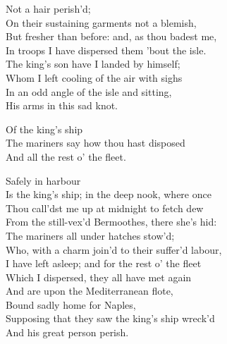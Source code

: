 	
	
\begin{verse_speech}[Ariel] 
Not a hair perish'd;\\
On their sustaining garments not a blemish,\\
But fresher than before: and, as thou badest me,\\
In troops I have dispersed them 'bout the isle.\\
The king's son have I landed by himself;\\
Whom I left cooling of the air with sighs\\
In an odd angle of the isle and sitting,\\
His arms in this sad knot.
\end{verse_speech}

\begin{verse_speech}[Prospero] 
Of the king's ship\\
The mariners say how thou hast disposed\\
And all the rest o' the fleet.
\end{verse_speech}

\begin{verse_speech}[Ariel] 
Safely in harbour\\
Is the king's ship; in the deep nook, where once\\
Thou call'dst me up at midnight to fetch dew\\
From the still-vex'd Bermoothes, there she's hid:\\
The mariners all under hatches stow'd;\\
Who, with a charm join'd to their suffer'd labour,\\
I have left asleep; and for the rest o' the fleet\\
Which I dispersed, they all have met again\\
And are upon the Mediterranean flote,\\
Bound sadly home for Naples,\\
Supposing that they saw the king's ship wreck'd\\
And his great person perish.
\end{verse_speech}

